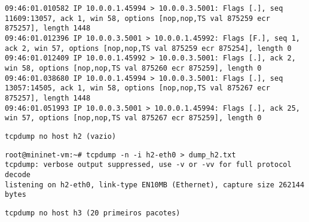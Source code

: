 \documentclass[12pt,letterpaper]{article}
\begin{document}
\begin{tiny}
\begin{verbatim}
09:46:01.010582 IP 10.0.0.1.45994 > 10.0.0.3.5001: Flags [.], seq 11609:13057, ack 1, win 58, options [nop,nop,TS val 875259 ecr 875257], length 1448
09:46:01.012396 IP 10.0.0.3.5001 > 10.0.0.1.45992: Flags [F.], seq 1, ack 2, win 57, options [nop,nop,TS val 875259 ecr 875254], length 0
09:46:01.012409 IP 10.0.0.1.45992 > 10.0.0.3.5001: Flags [.], ack 2, win 58, options [nop,nop,TS val 875260 ecr 875259], length 0
09:46:01.038680 IP 10.0.0.1.45994 > 10.0.0.3.5001: Flags [.], seq 13057:14505, ack 1, win 58, options [nop,nop,TS val 875267 ecr 875257], length 1448
09:46:01.051993 IP 10.0.0.3.5001 > 10.0.0.1.45994: Flags [.], ack 25, win 57, options [nop,nop,TS val 875267 ecr 875259], length 0
\end{verbatim}
\end{tiny}

\begin{verbatim}
tcpdump no host h2 (vazio)
\end{verbatim}

\begin{tiny}
\begin{verbatim}
root@mininet-vm:~# tcpdump -n -i h2-eth0 > dump_h2.txt
tcpdump: verbose output suppressed, use -v or -vv for full protocol decode
listening on h2-eth0, link-type EN10MB (Ethernet), capture size 262144 bytes
\end{verbatim}
\end{tiny}

\begin{verbatim}
tcpdump no host h3 (20 primeiros pacotes)
\end{verbatim}
\end{document}
